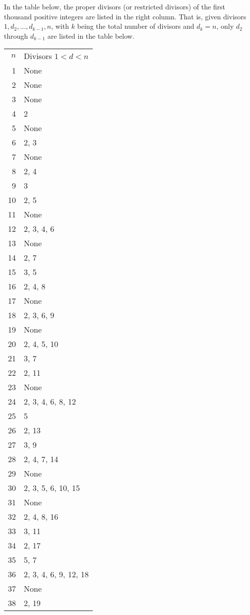 \documentclass[12pt]{article}
\begin{document}
In the table below, the proper divisors (or restricted divisors) of the first thousand positive integers are listed in the right column. That is, given divisors $1, d_2, \ldots , d_{k - 1}, n$, with $k$ being the total number of divisors and $d_k = n$, only $d_2$ through $d_{k - 1}$ are listed in the table below.

\begin{tabular}{|r|l|}
$n$ & Divisors $1 < d < n$ \\
1 & None \\
2 & None \\ 
3 & None \\ 
4 & 2 \\ 
5 & None \\ 
6 & 2, 3 \\ 
7 & None \\ 
8 & 2, 4 \\ 
9 & 3 \\ 
10 & 2, 5 \\ 
11 & None \\ 
12 & 2, 3, 4, 6 \\ 
13 & None \\ 
14 & 2, 7 \\ 
15 & 3, 5 \\ 
16 & 2, 4, 8 \\ 
17 & None \\ 
18 & 2, 3, 6, 9 \\ 
19 & None \\ 
20 & 2, 4, 5, 10 \\ 
21 & 3, 7 \\ 
22 & 2, 11 \\ 
23 & None \\ 
24 & 2, 3, 4, 6, 8, 12 \\ 
25 & 5 \\ 
26 & 2, 13 \\ 
27 & 3, 9 \\ 
28 & 2, 4, 7, 14 \\ 
29 & None \\ 
30 & 2, 3, 5, 6, 10, 15 \\ 
31 & None \\ 
32 & 2, 4, 8, 16 \\ 
33 & 3, 11 \\ 
34 & 2, 17 \\ 
35 & 5, 7 \\ 
36 & 2, 3, 4, 6, 9, 12, 18 \\ 
37 & None \\ 
38 & 2, 19 \\ 

\end{tabular}
\end{document}
